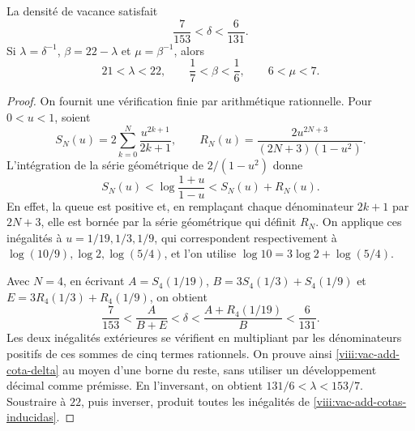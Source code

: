 \begin{lemma}
\label{viii:vac-add-cotas}
La densité de vacance satisfait
\begin{equation}
 \frac7{153}<\delta<\frac6{131}.
 \label{viii:vac-add-cota-delta}
\end{equation}
Si \(\lambda=\delta^{-1}\), \(\beta=22-\lambda\) et
\(\mu=\beta^{-1}\), alors
\begin{equation}
 21<\lambda<22,
 \qquad \frac17<\beta<\frac16,
 \qquad 6<\mu<7.
 \label{viii:vac-add-cotas-inducidas}
\end{equation}
\end{lemma}
\begin{proof}
On fournit une vérification finie par arithmétique rationnelle. Pour \(0<u<1\), soient
\[
 S_N(u)=2\sum_{k=0}^{N}\frac{u^{2k+1}}{2k+1},
 \qquad
 R_N(u)=\frac{2u^{2N+3}}{(2N+3)(1-u^2)}.
\]
L'intégration de la série géométrique de \(2/(1-u^2)\) donne
\[
 S_N(u)<\log\frac{1+u}{1-u}<S_N(u)+R_N(u).
\]
En effet, la queue est positive et, en remplaçant chaque dénominateur
\(2k+1\) par \(2N+3\), elle est bornée par la série géométrique qui
définit \(R_N\). On applique ces inégalités à
\(u=1/19,1/3,1/9\), qui correspondent respectivement à
\(\log(10/9),\log2,\log(5/4)\), et l'on utilise
\(\log10=3\log2+\log(5/4)\).

Avec \(N=4\), en écrivant \(A=S_4(1/19)\), \(B=3S_4(1/3)+S_4(1/9)\) et \(E=3R_4(1/3)+R_4(1/9)\), on obtient
\[
 \frac7{153}
 <\frac{A}{B+E}
 <\delta
 <\frac{A+R_4(1/19)}{B}
 <\frac6{131}.
\]
Les deux inégalités extérieures se vérifient en multipliant par les
dénominateurs positifs de ces sommes de cinq termes rationnels.
On prouve ainsi \eqref{viii:vac-add-cota-delta} au moyen d'une borne du reste,
sans utiliser un développement décimal comme prémisse. En l'inversant, on obtient
\(131/6<\lambda<153/7\). Soustraire à \(22\), puis inverser,
produit toutes les inégalités de \eqref{viii:vac-add-cotas-inducidas}.
\end{proof}

